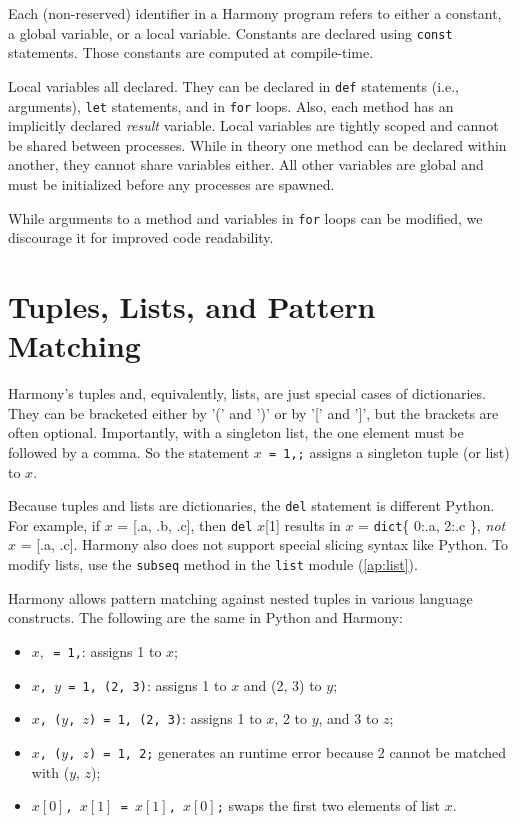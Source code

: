 \documentclass{report}
\begin{document}
Each (non-reserved) identifier in a Harmony program refers to either
a constant, a global variable, or a local variable.
Constants are declared using \texttt{const} statements.
Those constants are computed at compile-time.

Local variables all declared.  They can be declared in
\texttt{def} statements (i.e., arguments),
\texttt{let} statements, and in \texttt{for} loops.
Also, each method has an implicitly declared
\textit{result} variable.
Local variables are tightly scoped and cannot be shared
between processes.
While in theory one method can be declared within another,
they cannot share variables either.
All other variables are global and must be initialized
before any processes are spawned.

While arguments to a method and variables in \texttt{for} loops
can be modified, we discourage it for improved code readability.

\section{Tuples, Lists, and Pattern Matching}

Harmony's tuples and, equivalently, lists, are just special cases of dictionaries.
They can be bracketed either by '(' and ')' or by '[' and ']', but
the brackets are often optional.  Importantly, with a singleton list, the
one element must be followed by a comma.
So the statement \texttt{$x$ = 1,;} assigns a singleton tuple (or list) to $x$.

Because tuples and lists are dictionaries, the \texttt{del} statement is
different Python.  For example, if $x$ = [.a, .b, .c], then
\texttt{del} $x$[1] results in $x$ = \texttt{dict}\{ 0:.a, 2:.c \}, \emph{not}
$x$ = [.a, .c].
Harmony also does not support special slicing syntax like Python.
To modify lists, use the \texttt{subseq} method in the \texttt{list} module
(\autoref{ap:list}).

Harmony allows pattern matching against nested tuples in various
language constructs.
%
The following are the same in Python and Harmony:
\begin{itemize}
\item \texttt{$x,$ = 1,}: assigns 1 to $x$;
\item \texttt{$x$, $y$ = 1, (2, 3)}: assigns 1 to $x$ and (2, 3) to $y$;
\item \texttt{$x$, ($y$, $z$) = 1, (2, 3)}: assigns 1 to $x$, 2 to $y$, and
3 to $z$;
\item \texttt{$x$, ($y$, $z$) = 1, 2;} generates an runtime error because 2 cannot
be matched with ($y$, $z$);
\item \texttt{$x[0]$, $x[1]$ = $x[1]$, $x[0]$;} swaps the first two elements of list $x$.
\end{itemize}
\end{document}
